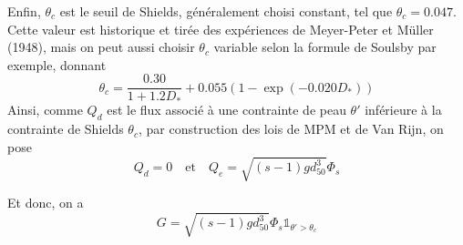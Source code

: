 \documentclass[11pt, a4paper, oneside]{report}
\begin{document}
\begin{samepage}
Enfin, $\theta_c$ est le seuil de Shields, généralement choisi constant, tel que $\theta_c = 0.047$. \\
Cette valeur est historique et tirée des expériences de Meyer-Peter et Müller (1948), mais on peut aussi choisir $\theta_c$ variable selon la formule de Soulsby \cite{soulsby1997dynamics} par exemple, donnant
\begin{equation}
    \theta_c = \frac{0.30}{1+1.2D_*} + 0.055 \left( 1 - \exp(-0.020D_*) \right)
\end{equation}
Ainsi, comme $Q_d$ est le flux associé à une contrainte de peau $\theta'$ inférieure à la contrainte de Shields $\theta_c$, par construction des lois de MPM et de Van Rijn, on pose
\begin{equation}
    Q_d = 0 \quad \text{et} \quad Q_e = \sqrt{(s-1) g d_{50}^3} \Phi_s
\end{equation}
\end{samepage}
Et donc, on a
\begin{equation}
    G = \sqrt{(s-1) g d_{50}^3} \Phi_s \mathds{1}_{\theta' > \theta_c}
\end{equation}
\end{document}
